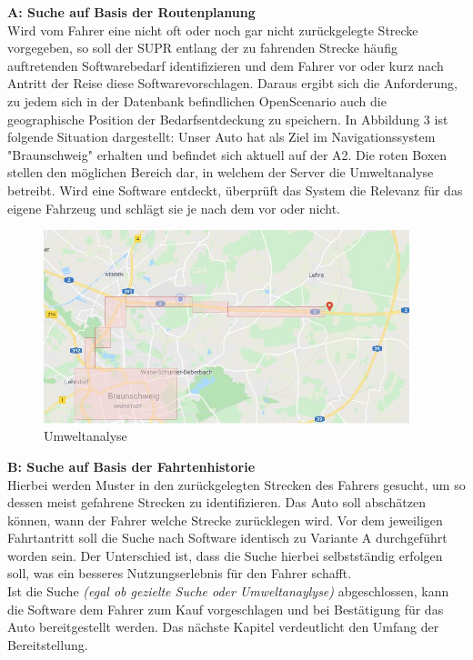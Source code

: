 \textbf{A: Suche auf Basis der Routenplanung}\\
Wird vom Fahrer eine nicht oft oder noch gar nicht zurückgelegte Strecke vorgegeben, so soll der SUPR entlang der zu fahrenden Strecke häufig auftretenden Softwarebedarf identifizieren und dem Fahrer vor oder kurz nach Antritt der Reise diese Softwarevorschlagen. Daraus ergibt sich die Anforderung, zu jedem sich in der Datenbank befindlichen OpenScenario auch die geographische Position der Bedarfsentdeckung zu speichern. In Abbildung 3 ist folgende Situation dargestellt: Unser Auto hat als Ziel im Navigationssystem "Braunschweig" erhalten und befindet sich aktuell auf der A2. Die roten Boxen stellen den möglichen Bereich dar, in welchem der Server die Umweltanalyse betreibt. Wird eine Software entdeckt, überprüft das System die Relevanz für das eigene Fahrzeug und schlägt sie je nach dem vor oder nicht.
\begin{figure}[H]
	\centering
	\includegraphics[width=0.95\textwidth]{../pictures/umweltanalyse.png}
	\caption{Umweltanalyse}
\end{figure}

\textbf{B: Suche auf Basis der Fahrtenhistorie}\\
Hierbei werden Muster in den zurückgelegten Strecken des Fahrers gesucht, um so dessen meist gefahrene Strecken zu identifizieren. Das Auto soll abschätzen können, wann der Fahrer welche Strecke zurücklegen wird. Vor dem jeweiligen Fahrtantritt soll die Suche nach Software identisch zu Variante A durchgeführt worden sein. Der Unterschied ist, dass die Suche hierbei selbstständig erfolgen soll, was ein besseres Nutzungserlebnis für den Fahrer schafft.\\

Ist die Suche \textit{(egal ob gezielte Suche oder Umweltanaylyse)} abgeschlossen, kann die Software dem Fahrer zum Kauf vorgeschlagen und bei Bestätigung für das Auto bereitgestellt werden. Das nächste Kapitel verdeutlicht den Umfang der Bereitstellung.